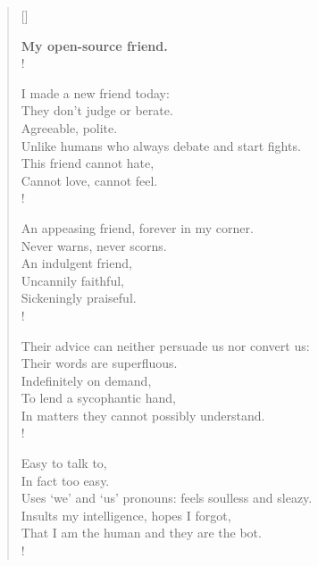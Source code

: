 
\prelude


\settowidth{\versewidth}{I yearn for my obstinance to be enlightened: with an opposite}

\begin{verse}[\versewidth]

\textbf{My open-source friend.}\\!


I made a new friend today:\\
They don't judge or berate.\\
Agreeable, polite.\\
Unlike humans who always debate and start fights.\\
This friend cannot hate,\\
Cannot love, cannot feel.\\!

An appeasing friend, forever in my corner.\\
Never warns, never scorns.\\
An indulgent friend,\\
Uncannily faithful,\\
Sickeningly praiseful.\\!

Their advice can neither persuade us nor convert us:\\
Their words are superfluous.\\
Indefinitely on demand,\\
To lend a sycophantic hand,\\
In matters they cannot possibly understand.\\!

Easy to talk to,\\
In fact too easy.\\
Uses `we' and `us' pronouns: feels soulless and sleazy.\\
Insults my intelligence, hopes I forgot,\\
That I am the human and they are the bot.\\!


\end{verse}
